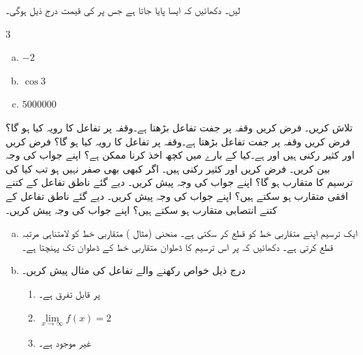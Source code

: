  لیں۔ دکھائیں کہ ایسا  پایا جاتا ہے  جس پر   کی قیمت درج ذیل ہوگی۔ 
\begin{multicols}{3}
\begin{enumerate}[a.]
\item
$-2$
\item
$\cos 3$
\item
$\num{5000000}$
\end{enumerate}
\end{multicols}
 تلاش کریں۔
\quad
فرض کریں وقفہ  پر جفت تفاعل بڑھتا ہے۔وقفہ  پر تفاعل کا رویہ کیا ہو گا؟
\quad
فرض کریں وقفہ  پر جفت تفاعل بڑھتا ہے۔وقفہ  پر تفاعل کا رویہ کیا ہو گا؟
فرض کریں  اور  کثیر رکنی ہیں اور  ہے۔کیا 
 کے بارے میں کچھ اخذ کرنا ممکن ہے؟ اپنے جواب کی وجہ بین کریں۔
فرض کریں  اور  کثیر رکنی ہیں۔ اگر  کبھی بھی صفر نہیں ہو تب کیا  کی ترسیم کا متقارب ہو گا؟ اپنے جواب کی وجہ پیش کریں۔
دیے گئے ناطق تفاعل کے  کتنے افقی متقارب ہو سکتے ہیں؟ اپنے جواب کی وجہ پیش کریں۔
دیے گئے ناطق تفاعل کے  کتنے انتصابی متقارب ہو سکتے ہیں؟ اپنے جواب کی وجہ پیش کریں۔
\begin{enumerate}[a.]
\item

ایک ترسیم اپنے متقاربی خط کو قطع کر سکتی ہے۔ منحنی  (مثال ) متقاربی خط کو لامتناہی مرتبہ  قطع کرتی ہے۔ دکھائیں کہ  پر اس ترسیم کا ڈھلوان متقاربی خط کے ڈھلوان تک پہنچتا ہے۔ 
\item
درج ذیل خواص رکھنے والے تفاعل  کی مثال پیش کریں۔
\begin{enumerate}[1)]
\item
{} پر  قابل تفرق ہے۔
\item
$\lim\limits_{x\to\infty}f(x)=2$
\item
{} غیر موجود ہے۔
\end{enumerate}
\end{enumerate}
